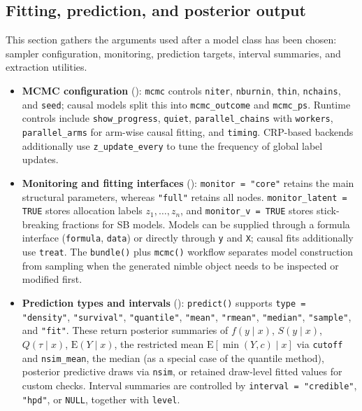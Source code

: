\documentclass[article]{jss}\usepackage[]{graphicx}\usepackage[]{xcolor}
\DeclareRobustCommand{\pkg}[1]{\textsf{#1}}
\DeclareRobustCommand{\code}[1]{\nolinkurl{#1}}
\begin{document}
\subsection{Fitting, prediction, and posterior output}
\label{subsec:app-fitting}

This section gathers the arguments used after a model class has been chosen: sampler configuration, monitoring, prediction targets, interval summaries, and extraction utilities.

\begin{itemize}
\item \textbf{MCMC configuration} (\label{subsec:app-mcmc}): \code{mcmc} controls \code{niter}, \code{nburnin}, \code{thin}, \code{nchains}, and \code{seed}; causal models split this into \code{mcmc\_outcome} and \code{mcmc\_ps}. Runtime controls include \code{show\_progress}, \code{quiet}, \code{parallel\_chains} with \code{workers}, \code{parallel\_arms} for arm-wise causal fitting, and \code{timing}. CRP-based backends additionally use \code{z\_update\_every} to tune the frequency of global label updates.
\item \textbf{Monitoring and fitting interfaces} (\label{subsec:app-monitors}): \code{monitor = "core"} retains the main structural parameters, whereas \code{"full"} retains all nodes. \code{monitor\_latent = TRUE} stores allocation labels $z_1,\ldots,z_n$, and \code{monitor\_v = TRUE} stores stick-breaking fractions for SB models. Models can be supplied through a formula interface (\code{formula}, \code{data}) or directly through \code{y} and \code{X}; causal fits additionally use \code{treat}. The \code{bundle()} plus \code{mcmc()} workflow separates model construction from sampling when the generated \pkg{nimble} object needs to be inspected or modified first.

\item \textbf{Prediction types and intervals} (\label{subsec:app-predict}): \code{predict()} supports \code{type = "density"}, \code{"survival"}, \code{"quantile"}, \code{"mean"}, \code{"rmean"}, \code{"median"}, \code{"sample"}, and \code{"fit"}. These return posterior summaries of $f(y \mid x)$, $S(y \mid x)$, $Q(\tau \mid x)$, $\mathrm{E}(Y \mid x)$, the restricted mean $\mathrm{E}[\min(Y, c) \mid x]$ via \code{cutoff} and \code{nsim\_mean}, the median (as a special case of the quantile method), posterior predictive draws via \code{nsim}, or retained draw-level fitted values for custom checks. Interval summaries are controlled by \code{interval = "credible"}, \code{"hpd"}, or \code{NULL}, together with \code{level}.


\end{itemize}
\end{document}
